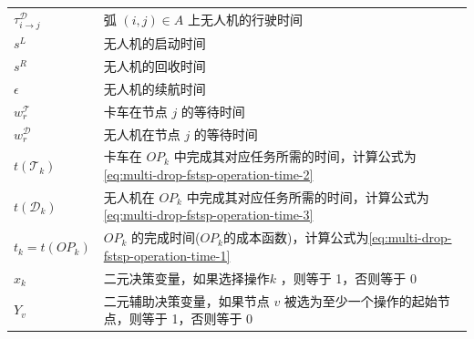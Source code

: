 \begin{table}[!htbp]
\begin{tabularx}{\textwidth}{lX}
        $\tau_{i\to j}^\mathscr{D}$ & 弧 $(i, j) \in A$ 上无人机的行驶时间 \\
        $s^L$ & 无人机的启动时间 \\
        $s^R$ & 无人机的回收时间 \\
        $\epsilon$ & 无人机的续航时间 \\
        $w_r^{\mathscr{T}}$ & 卡车在节点 $j$ 的等待时间 \\
        $w_r^{\mathscr{D}}$ & 无人机在节点 $j$ 的等待时间 \\
        $t(\mathscr{T}_k)$ & 卡车在 $OP_k$ 中完成其对应任务所需的时间，计算公式为\ref{eq:multi-drop-fstsp-operation-time-2} \\
        $t(\mathscr{D}_k)$ & 无人机在 $OP_k$ 中完成其对应任务所需的时间，计算公式为\ref{eq:multi-drop-fstsp-operation-time-3} \\
        $t_k = t(OP_k)$ & $OP_k$ 的完成时间($OP_k$的成本函数)，计算公式为\ref{eq:multi-drop-fstsp-operation-time-1} \\
        $x_k$ & 二元决策变量，如果选择操作$k$ ，则等于 1，否则等于 0 \\
        $Y_v$ & 二元辅助决策变量，如果节点 $v$ 被选为至少一个操作的起始节点，则等于 1，否则等于 0 \\
        \bottomrule[1pt]
    \end{tabularx}
\end{table}


